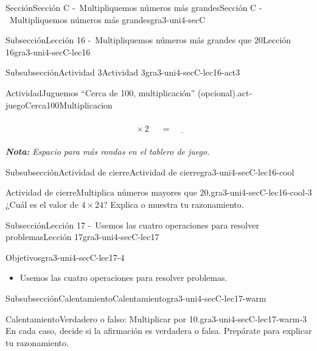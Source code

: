 \documentclass[twoside,10pt,]{article}
\newcommand{\alert}[1]{\textbf{\textit{#1}}}
\begin{document}
\begin{sectionptx}{Sección}{Sección C -~Multipliquemos números más grandes}{}{Sección C -~Multipliquemos números más grandes}{}{}{gra3-uni4-secC}
\begin{subsectionptx}{Subsección}{Lección 16 -~Multipliquemos números más grandes que 20}{}{Lección 16}{}{}{gra3-uni4-secC-lec16}
\begin{subsubsectionptx}{Subsubsección}{Actividad 3}{}{Actividad 3}{}{}{gra3-uni4-secC-lec16-act3}
\begin{activity}{Actividad}{Juguemos “Cerca de 100, multiplicación” (opcional).}{act-juegoCerca100Multiplicacion}
\begin{sidebyside}{2}{0}{0}{0.1}
\begin{sbspanel}{0.45}
\begin{equation*}
\boxed{\phantom{\frac{00}{00}}} \times 2 \ \boxed{\phantom{\frac{00}{00}}}= \underline{\hspace{1cm}}
\end{equation*}
%
\end{sbspanel}%
\end{sidebyside}%
\alert{Nota:} \emph{Espacio para más rondas en el tablero de juego.}%
\end{activity}%
\end{subsubsectionptx}
%
%
\typeout{************************************************}
\typeout{************************************************}
%
\begin{subsubsectionptx}{Subsubsección}{Actividad de cierre}{}{Actividad de cierre}{}{}{gra3-uni4-secC-lec16-cool}
\begin{project}{Actividad de cierre}{Multiplica números mayores que 20.}{gra3-uni4-secC-lec16-cool-3}%
¿Cuál es el valor de \(4\times 24\)? Explica o muestra tu razonamiento.%
\end{project}%
\end{subsubsectionptx}
\end{subsectionptx}
%
%
\typeout{************************************************}
\typeout{************************************************}
%
\begin{subsectionptx}{Subsección}{Lección 17 -~Usemos las cuatro operaciones para resolver problemas}{}{Lección 17}{}{}{gra3-uni4-secC-lec17}
\begin{objectives}{Objetivos}{gra3-uni4-secC-lec17-4}
%
\begin{itemize}[label=\textbullet]
\item{}Usemos las cuatro operaciones para resolver problemas.%
\end{itemize}
\end{objectives}
%
%
\typeout{************************************************}
\typeout{************************************************}
%
\begin{subsubsectionptx}{Subsubsección}{Calentamiento}{}{Calentamiento}{}{}{gra3-uni4-secC-lec17-warm}
\begin{exploration}{Calentamiento}{Verdadero o falso: Multiplicar por 10.}{gra3-uni4-secC-lec17-warm-3}%
En cada caso, decide si la afirmación es verdadera o falsa. Prepárate para explicar tu razonamiento.%
%
\begin{itemize}[label=\textbullet]

\end{itemize}
\end{exploration}
\end{subsubsectionptx}
\end{subsectionptx}
\end{sectionptx}
\end{document}
